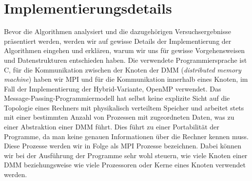 \documentclass[11pt,a4paper]{article}
\begin{document}
\section{Implementierungsdetails}
\label{sec:details}
Bevor die Algorithmen analysiert und die dazugehörigen Versuchsergebnisse präsentiert werden, werden wir auf gewisse Details der Implementierung der Algorithmen eingehen und erklären, warum wir uns für gewisse Vorgehensweisen und Datenstrukturen entschieden haben. Die verwendete Programmiersprache ist C, für die Kommunikation zwischen der Knoten der DMM (\textit{distributed memory machine}) haben wir MPI und für die Kommunikation innerhalb eines Knoten, im Fall der Implementierung der Hybrid-Variante, OpenMP verwendet. Das Message-Passing-Programmiermodell hat selbst keine explizite Sicht auf die Topologie eines Rechners mit physikalisch verteiltem Speicher und arbeitet stets mit einer bestimmten Anzahl von Prozessen mit zugeordneten Daten, was zu einer Abstraktion einer DMM führt. Dies führt zu einer Portabilität der Programme, da man keine genauen Informationen über die Rechner kennen muss.\\
Diese Prozesse werden wir in Folge als MPI Prozesse bezeichnen. Dabei können wir bei der Ausführung der Programme sehr wohl steuern, wie viele Knoten einer DMM beziehungsweise wie viele Prozessoren oder Kerne eines Knoten verwendet werden.
\end{document}

